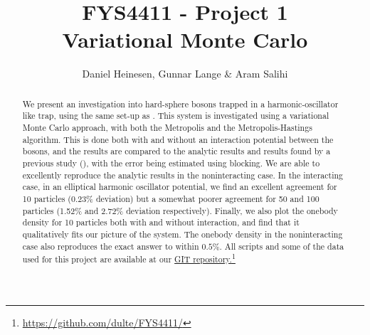\documentclass[a4paper, 10pt]{article}
\title{FYS4411 - Project 1\\
	Variational Monte Carlo}
\author{Daniel Heinesen, Gunnar Lange \& Aram Salihi}
\begin{document}
	\maketitle
	\begin{abstract}
	We present an investigation into hard-sphere bosons trapped in a harmonic-oscillator like trap, using the same set-up as \cite{DuBois2001}. This system is investigated using a variational Monte Carlo approach, with both the Metropolis and the Metropolis-Hastings algorithm. This is done both with and without an interaction potential between the bosons, and the results are compared to the analytic results and results found by a previous study (\cite{Kristiansen2016}), with the error being estimated using blocking. We are able to excellently reproduce the analytic results in the noninteracting case. In the interacting case, in an elliptical harmonic oscillator potential, we find an excellent agreement for 10 particles (0.23\% deviation) but a somewhat poorer agreement for 50 and 100 particles (1.52\% and 2.72\% deviation respectively).
	Finally, we also plot the onebody density for 10 particles both with and without interaction, and find that it qualitatively fits our picture of the system. The onebody density in the noninteracting case also reproduces the exact answer to within $0.5\%$. All scripts and some of the data used for this project are available at our \href{https://github.com/dulte/FYS4411/}{GIT repository.}\footnote{\url{https://github.com/dulte/FYS4411/}}
	\end{abstract}
	\newpage
	\tableofcontents
	\newpage
\end{document}
